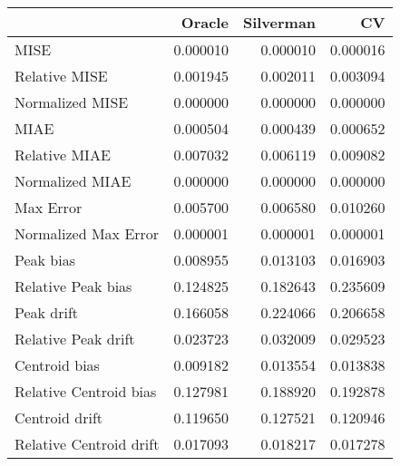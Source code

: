 \begin{tabular}{lrrr}
  \hline
 & Oracle & Silverman & CV \\ 
  \hline
MISE & 0.000010 & 0.000010 & 0.000016 \\ 
  Relative MISE & 0.001945 & 0.002011 & 0.003094 \\ 
  Normalized MISE & 0.000000 & 0.000000 & 0.000000 \\ 
  MIAE & 0.000504 & 0.000439 & 0.000652 \\ 
  Relative MIAE & 0.007032 & 0.006119 & 0.009082 \\ 
  Normalized MIAE & 0.000000 & 0.000000 & 0.000000 \\ 
  Max Error & 0.005700 & 0.006580 & 0.010260 \\ 
  Normalized Max Error & 0.000001 & 0.000001 & 0.000001 \\ 
  Peak bias & 0.008955 & 0.013103 & 0.016903 \\ 
  Relative Peak bias & 0.124825 & 0.182643 & 0.235609 \\ 
  Peak drift & 0.166058 & 0.224066 & 0.206658 \\ 
  Relative Peak drift & 0.023723 & 0.032009 & 0.029523 \\ 
  Centroid bias & 0.009182 & 0.013554 & 0.013838 \\ 
  Relative Centroid bias & 0.127981 & 0.188920 & 0.192878 \\ 
  Centroid drift & 0.119650 & 0.127521 & 0.120946 \\ 
  Relative Centroid drift & 0.017093 & 0.018217 & 0.017278 \\ 
   \hline
\end{tabular}
